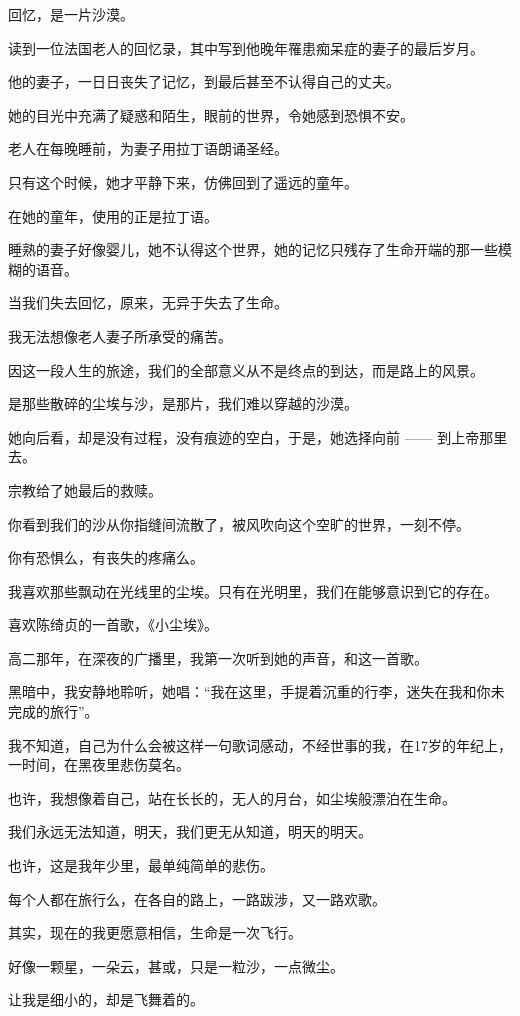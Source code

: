 \documentclass[12pt,a4paper]{article}
\begin{document}
		回忆，是一片沙漠。\par
		读到一位法国老人的回忆录，其中写到他晚年罹患痴呆症的妻子的最后岁月。\par
		他的妻子，一日日丧失了记忆，到最后甚至不认得自己的丈夫。\par
		她的目光中充满了疑惑和陌生，眼前的世界，令她感到恐惧不安。\par
		老人在每晚睡前，为妻子用拉丁语朗诵圣经。\par
		只有这个时候，她才平静下来，仿佛回到了遥远的童年。\par
		在她的童年，使用的正是拉丁语。\par
		睡熟的妻子好像婴儿，她不认得这个世界，她的记忆只残存了生命开端的那一些模糊的语音。\par
		当我们失去回忆，原来，无异于失去了生命。\par
		我无法想像老人妻子所承受的痛苦。\par
		因这一段人生的旅途，我们的全部意义从不是终点的到达，而是路上的风景。\par
		是那些散碎的尘埃与沙，是那片，我们难以穿越的沙漠。\par
		她向后看，却是没有过程，没有痕迹的空白，于是，她选择向前 —— 到上帝那里去。\par
		宗教给了她最后的救赎。

		你看到我们的沙从你指缝间流散了，被风吹向这个空旷的世界，一刻不停。\par
		你有恐惧么，有丧失的疼痛么。\par
		我喜欢那些飘动在光线里的尘埃。只有在光明里，我们在能够意识到它的存在。\par
		喜欢陈绮贞的一首歌，《小尘埃》。\par
		高二那年，在深夜的广播里，我第一次听到她的声音，和这一首歌。\par
		黑暗中，我安静地聆听，她唱：“我在这里，手提着沉重的行李，迷失在我和你未完成的旅行”。\par
		我不知道，自己为什么会被这样一句歌词感动，不经世事的我，在17岁的年纪上，一时间，在黑夜里悲伤莫名。\par
		也许，我想像着自己，站在长长的，无人的月台，如尘埃般漂泊在生命。\par
		我们永远无法知道，明天，我们更无从知道，明天的明天。\par
		也许，这是我年少里，最单纯简单的悲伤。\par
		每个人都在旅行么，在各自的路上，一路跋涉，又一路欢歌。\par
		其实，现在的我更愿意相信，生命是一次飞行。\par
		好像一颗星，一朵云，甚或，只是一粒沙，一点微尘。\par
		让我是细小的，却是飞舞着的。
\end{document}
